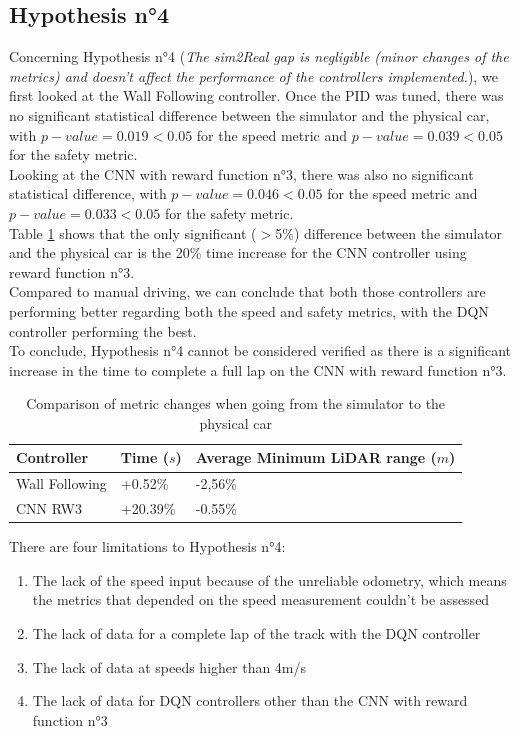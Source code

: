 \subsection{Hypothesis n°4}
Concerning Hypothesis n°4 (\textit{The sim2Real gap is negligible (minor changes of the metrics) and doesn't affect the performance of the controllers implemented.}), we first looked at the Wall Following controller. Once the PID was tuned, there was no significant statistical difference between the simulator and the physical car, with $p-value=0.019<0.05$ for the speed metric and $p-value=0.039<0.05$ for the safety metric. \\
Looking at the CNN with reward function n°3, there was also no significant statistical difference, with $p-value=0.046<0.05$ for the speed metric and $p-value=0.033<0.05$ for the safety metric. \\
Table \ref{h4comparisons} shows that the only significant ($>$5\%) difference between the simulator and the physical car is the 20\% time increase for the CNN controller using reward function n°3. \\
Compared to manual driving, we can conclude that both those controllers are performing better regarding both the speed and safety metrics, with the DQN controller performing the best. \\
To conclude, Hypothesis n°4 cannot be considered verified as there is a significant increase in the time to complete a full lap on the CNN with reward function n°3.

\begin{table}[H]
\centering
\begin{tabularx}{\textwidth}{||X|X|X||} 
\hline
 Controller & Time ($s$) & Average Minimum LiDAR range ($m$) \\ [0.5ex] 
 \hline\hline
Wall Following & +0.52\% & -2,56\% \\[0.5ex] 
 \hline
CNN RW3 & +20.39\% & -0.55\% \\[0.5ex] 
 \hline
\end{tabularx}
\caption{Comparison of metric changes when going from the simulator to the physical car}
\label{h4comparisons}
\end{table}


There are four limitations to Hypothesis n°4:
\begin{enumerate}
	\item The lack of the speed input because of the unreliable odometry, which means the metrics that depended on the speed measurement couldn't be assessed
	\item The lack of data for a complete lap of the track with the DQN controller
	\item The lack of data at speeds higher than 4m/s
	\item The lack of data for DQN controllers other than the CNN with reward function n°3
\end{enumerate}

